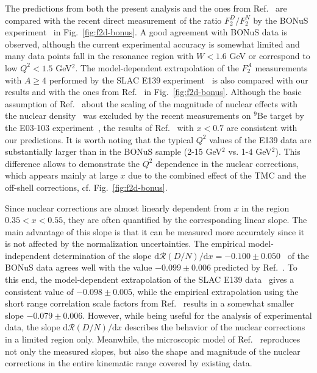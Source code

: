 \documentclass[%
      aps,
      prd,
      floatfix,
      preprintnumbers,
      preprint,
      showpacs,
      nofootinbib,
      tightenlines,
      amssymb,
      amsmath
]{revtex4-1}
\newcommand{\ud}     {\mathrm{d}}
\begin{document}
The predictions from both the present analysis and the ones from Ref.~\cite{KP04} are compared 
with the recent direct measurement of the
ratio $F_2^D/F_2^N$ by the BONuS experiment~\cite{Griffioen:2015hxa} in Fig.~\ref{fig:f2d-bonus}.  
A good agreement with BONuS data is observed, although the current experimental accuracy is 
somewhat limited and many data points fall in the resonance region with $W<1.6$ GeV or 
correspond to low $Q^2<1.5$ GeV$^2$.
% 
The model-dependent extrapolation of the $F_2^A$ measurements with $A\geq4$ performed by the SLAC E139
experiment~\cite{Gomez:1993ri} is also compared with our results and with the ones from Ref.~\cite{KP04} 
in Fig.~\ref{fig:f2d-bonus}.  
Although the basic assumption of Ref.~\cite{Gomez:1993ri} about the scaling of the magnitude of 
nuclear effects with the nuclear density~\cite{Frankfurt:1988nt} was excluded by the recent 
measurements on ${}^9$Be target by the E03-103 experiment~\cite{Seely:2009gt}, the 
results of Ref.~\cite{Gomez:1993ri} with $x<0.7$ are consistent with our predictions.    
It is worth noting that the typical $Q^2$ values of the E139 data are  
substantially larger than in the BONuS sample (2-15 GeV$^2$ vs. 1-4 GeV$^2$). 
This difference allows to demonstrate the $Q^2$ dependence in the nuclear corrections, 
which appears mainly at large $x$ due to the combined effect of the  
TMC and the off-shell corrections, cf. Fig.~\ref{fig:f2d-bonus}. 

Since nuclear corrections are almost linearly dependent from $x$ in the 
region $0.35 < x < 0.55$, they are often quantified by the corresponding linear slope. 
The main advantage of this slope is that it can be measured more accurately since it 
is not affected by the normalization uncertainties. 
The empirical model-independent determination of the slope 
$\ud {\mathcal R}(D/N) / \ud x=-0.100\pm0.050$~\cite{Griffioen:2015hxa} of the BONuS data  
agrees well with the value $-0.099\pm0.006$ predicted by Ref.~\cite{KP04}.
To this end, the model-dependent extrapolation of the SLAC E139 data~\cite{Gomez:1993ri}  
gives a consistent value of $-0.098\pm0.005$, while 
the empirical extrapolation using the short range correlation scale factors 
from Ref.~\cite{Weinstein:2010rt} results in a somewhat smaller slope $-0.079\pm0.006$.
However, while being useful for the analysis of experimental data, the slope $\ud {\mathcal R}(D/N) / \ud x$  
describes the behavior of the nuclear corrections in a limited region only. 
Meanwhile, the microscopic model of Ref.~\cite{KP04} reproduces not only the measured slopes,  
but also the shape and magnitude of the nuclear corrections in the entire kinematic range 
covered by existing data. 
\end{document}

